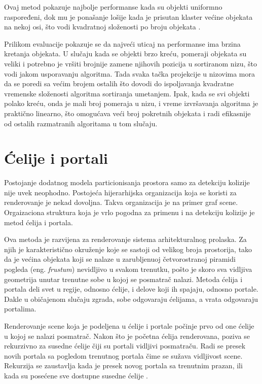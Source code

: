 \documentclass[12pt,oneside]{memoir}
\begin{document}
Ovaj metod pokazuje najbolje performanse kada su objekti uniformno raspoređeni, dok mu je ponašanje lošije kada je
prisutan klaster većine objekata na nekoj osi, što vodi kvadratnoj složenosti po broju objekata \cite{glavna2}.

Prilikom evaluacije pokazuje se da najveći uticaj na performanse ima brzina kretanja objekata.
U slučaju kada se objekti brzo kreću, pomeraji objekata su veliki i potrebno je vršiti brojnije zamene njihovih pozicija u sortiranom nizu,
što vodi jakom usporavanju algoritma.
Tada svaka tačka projekcije u nizovima mora 
da se poredi sa većim brojem ostalih što dovodi do ispoljavanja kvadratne vremenske složenosti algoritma sortiranja umetanjem.
Ipak, kada se svi objekti polako kreću, onda je mali broj pomeraja u nizu, i vreme izvršavanja algoritma je praktično 
linearno, što omogućava veći broj pokretnih objekata i radi efikasnije od ostalih razmatranih algoritama u tom slučaju.

\section{Ćelije i portali}
\label{subsec:cells}

Postojanje dodatnog modela particionisanja prostora samo za detekciju kolizije nije uvek neophodno.
Postojeća hijerarhijska organizacija koja se koristi za renderovanje je nekad dovoljna.
Takva organizacija je na primer graf scene. Orgaizaciona struktura koja je vrlo pogodna
za primenu i na detekciju kolizije je metod ćelija i portala.

Ova metoda je razvijena za renderovanje sistema arhitekturalnog prolaska. 
Za njih je karakteristično okruženje koje se sastoji od velikog broja prostorija, tako da je 
većina objekata koji se nalaze u zarubljenuoj četvorostranoj piramidi pogleda (eng. {\em frustum})
nevidljivo u svakom trenutku, pošto je skoro sva vidljiva geometrija unutar trenutne sobe
u kojoj se posmatrač nalazi.
Metoda ćelija i portala deli svet u regije, odnosno ćelije, i delove koji ih spajaju, odnosno portale.
Dakle u običajenom slučaju zgrada, sobe odgovaraju ćelijama, a vrata odgovaraju portalima. 

Renderovanje scene koja je podeljena u ćelije i portale počinje prvo od one ćelije u 
kojoj se nalazi posmatrač. Nakon što je početna ćelija renderovana, poziva se rekurzivno
za susedne ćelije čiji su portali vidljivi posmatraču. Radi se presek novih portala
sa pogledom trenutnog portala čime se sužava vidljivost scene. Rekurzija se zaustavlja 
kada je presek novog portala sa trenutnim prazan, ili kada su posećene sve dostupne susedne ćelije \cite{glavnaKnjiga}.
\end{document}
